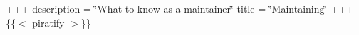 +++ description = \char`\"{}\+What to know as a maintainer\char`\"{} title = \char`\"{}\+Maintaining\char`\"{} +++ \{\{$<$ piratify $>$\}\} 